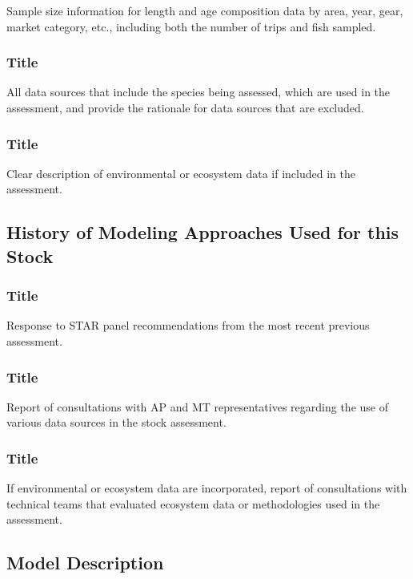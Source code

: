 \documentclass[12pt,]{article}
\begin{document}
Sample size information for length and age composition data by area,
year, gear, market category, etc., including both the number of trips
and fish sampled.

\subsubsection{Title}\label{title-2}

All data sources that include the species being assessed, which are used
in the assessment, and provide the rationale for data sources that are
excluded.

\subsubsection{Title}\label{title-3}

Clear description of environmental or ecosystem data if included in the
assessment.

\subsection{History of Modeling Approaches Used for this
Stock}\label{history-of-modeling-approaches-used-for-this-stock}

\subsubsection{Title}\label{title-4}

Response to STAR panel recommendations from the most recent previous
assessment.

\subsubsection{Title}\label{title-5}

Report of consultations with AP and MT representatives regarding the use
of various data sources in the stock assessment.

\subsubsection{Title}\label{title-6}

If environmental or ecosystem data are incorporated, report of
consultations with technical teams that evaluated ecosystem data or
methodologies used in the assessment.

\subsection{Model Description}\label{model-description}
\end{document}
